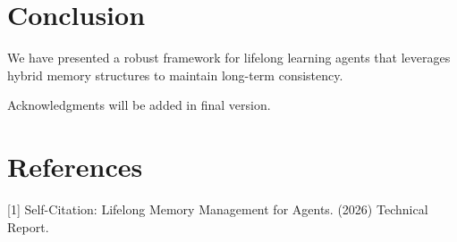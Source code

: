 \documentclass{article}
\begin{document}
\section{Conclusion}
We have presented a robust framework for lifelong learning agents that leverages hybrid memory structures to maintain long-term consistency.


\begin{ack}
Acknowledgments will be added in final version.
\end{ack}

\section*{References}

\small
[1] Self-Citation: Lifelong Memory Management for Agents. (2026) Technical Report.
\end{document}
